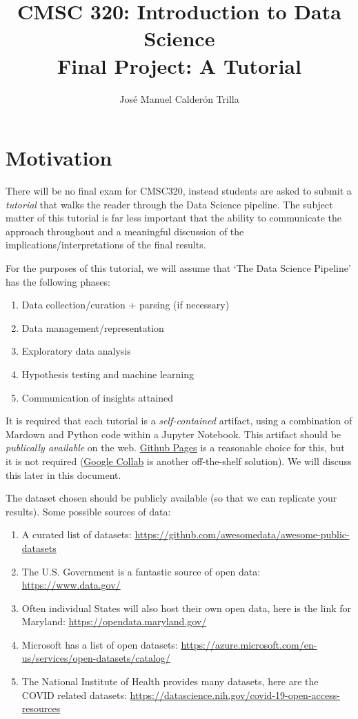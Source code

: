 \documentclass{article}
\title{CMSC 320: Introduction to Data Science\\
      \textbf{Final Project: A Tutorial}}
\author{Jos\'{e} Manuel Calder\'{o}n Trilla}
\date{\fbox{\fbox{\textbf{\redit{Due by 16:00 (EDT) on May 17, 2021}}}}}
\begin{document}
\maketitle


\section*{Motivation}

There will be no final exam for CMSC320, instead students are asked to submit a
\emph{tutorial} that walks the reader through the Data Science pipeline. The
subject matter of this tutorial is far less important that the ability to
communicate the approach throughout and a meaningful discussion of the
implications/interpretations of the final results.

For the purposes of this tutorial, we will assume that `The Data Science
Pipeline' has the following phases:

\begin{enumerate}
  \item Data collection/curation + parsing (if necessary)
  \item Data management/representation
  \item Exploratory data analysis
  \item Hypothesis testing and machine learning
  \item Communication of insights attained
\end{enumerate}

It is required that each tutorial is a \emph{self-contained} artifact, using a
combination of Mardown and Python code within a Jupyter Notebook. This artifact
should be \emph{publically available} on the web.
\href{https://pages.github.com/}{Github Pages} is a reasonable choice for this,
but it is not required (\href{}{Google Collab} is another off-the-shelf
solution). We will discuss this later in this document.

The dataset chosen should be publicly available (so that we can replicate your
results). Some possible sources of data:

\begin{enumerate}
  \item A curated list of datasets: \url{https://github.com/awesomedata/awesome-public-datasets}
  \item The U.S. Government is a fantastic source of open data: \url{https://www.data.gov/}
  \item Often individual States will also host their own open data, here is the link for Maryland: \url{https://opendata.maryland.gov/}
  \item Microsoft has a list of open datasets: \url{https://azure.microsoft.com/en-us/services/open-datasets/catalog/}
  \item The National Institute of Health provides many datasets, here are the COVID related datasets: \url{https://datascience.nih.gov/covid-19-open-access-resources}
\end{enumerate}
\end{document}
